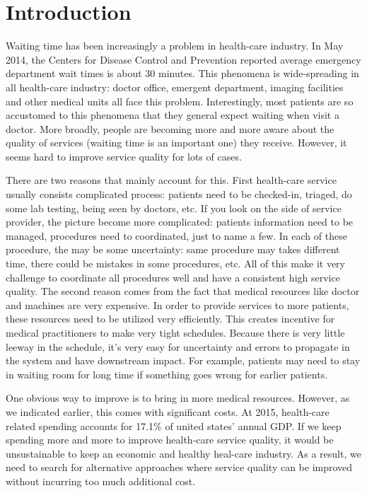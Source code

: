 \section{Introduction}

Waiting time has been increasingly a problem in health-care industry. In May 2014, the Centers for Disease Control and Prevention reported average emergency department wait times is about 30 minutes. This phenomena is wide-spreading in all health-care industry: doctor office, emergent department, imaging facilities and other medical units all face this problem. Interestingly, most patients are so accustomed to this phenomena that they general expect waiting when visit a doctor. More broadly, people are becoming more and more aware about the quality of services (waiting time is an important one) they receive. However, it seems hard to improve service quality for lots of cases.

There are two reasons that mainly account for this. First health-care service usually consists complicated process: patients need to be checked-in, triaged, do some lab testing, being seen by doctors, etc. If you look on the side of service provider, the picture become more complicated: patients information need to be managed, procedures need to coordinated, just to name a few. In each of these procedure, the may be some uncertainty: same procedure may takes different time, there could be mistakes in some procedures, etc. All of this make it very challenge to coordinate all procedures well and have a consistent high service quality. The second reason comes from the fact that medical resources like doctor and machines are very expensive. In order to provide services to more patients, these resources need to be utilized very efficiently. This creates incentive for medical practitioners to make very tight schedules. Because there is very little leeway in the schedule, it's very easy for uncertainty and errors to propagate in the system and have downstream impact. For example, patients may need to stay in waiting room for long time if something goes wrong for earlier patients.

One obvious way to improve is to bring in more medical resources. However, as we indicated earlier, this comes with significant costs. At 2015, health-care related spending accounts for 17.1\% of united states' annual GDP. If we keep spending more and more to improve health-care service quality, it would be unsustainable to keep an economic and healthy heal-care industry. As a result, we need to search for alternative approaches where service quality can be improved without incurring too much additional cost.

